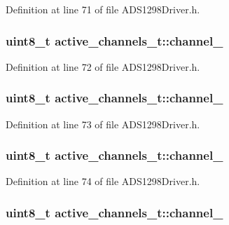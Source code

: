 \-Definition at line 71 of file \-A\-D\-S1298\-Driver.\-h.

\hypertarget{structactive__channels__t_ad68b7e88f03d812fe0225882936447c4}{
\subsubsection[{channel\-\_\-3}]{\setlength{\rightskip}{0pt plus 5cm}uint8\-\_\-t {\bf active\-\_\-channels\-\_\-t\-::channel\-\_}}}\label{structactive__channels__t_ad68b7e88f03d812fe0225882936447c4}


\-Definition at line 72 of file \-A\-D\-S1298\-Driver.\-h.

\hypertarget{structactive__channels__t_a9ecd322b0ff8a67f4fd202a744b799f6}{
\subsubsection[{channel\-\_\-4}]{\setlength{\rightskip}{0pt plus 5cm}uint8\-\_\-t {\bf active\-\_\-channels\-\_\-t\-::channel\-\_}}}\label{structactive__channels__t_a9ecd322b0ff8a67f4fd202a744b799f6}


\-Definition at line 73 of file \-A\-D\-S1298\-Driver.\-h.

\hypertarget{structactive__channels__t_a7d77374691523079291fd04089f364c6}{
\subsubsection[{channel\-\_\-5}]{\setlength{\rightskip}{0pt plus 5cm}uint8\-\_\-t {\bf active\-\_\-channels\-\_\-t\-::channel\-\_}}}\label{structactive__channels__t_a7d77374691523079291fd04089f364c6}


\-Definition at line 74 of file \-A\-D\-S1298\-Driver.\-h.

\hypertarget{structactive__channels__t_a28dd6831fc9e9abcb8c484bd806d4b51}{
\subsubsection[{channel\-\_\-6}]{\setlength{\rightskip}{0pt plus 5cm}uint8\-\_\-t {\bf active\-\_\-channels\-\_\-t\-::channel\-\_}}}\label{structactive__channels__t_a28dd6831fc9e9abcb8c484bd806d4b51}


